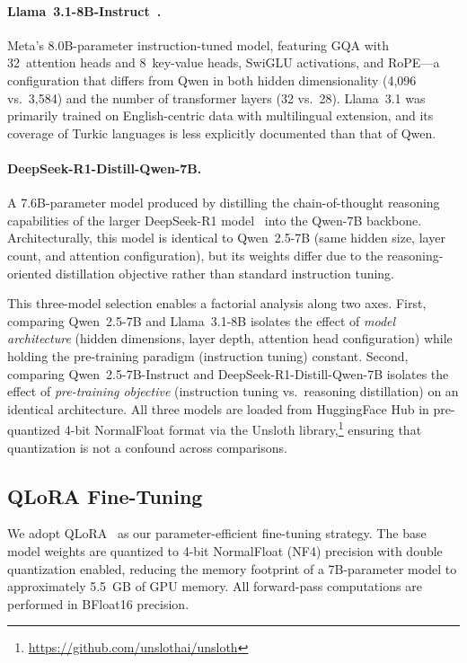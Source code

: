 \documentclass[runningheads]{llncs}
\begin{document}
\paragraph{Llama~3.1-8B-Instruct~\cite{Grattafiori2024-ka}.} Meta's 8.0B-parameter instruction-tuned model, featuring GQA with 32~attention heads and 8~key-value heads, SwiGLU activations, and RoPE---a configuration that differs from Qwen in both hidden dimensionality (4{,}096 vs.\ 3{,}584) and the number of transformer layers (32 vs.\ 28). Llama~3.1 was primarily trained on English-centric data with multilingual extension, and its coverage of Turkic languages is less explicitly documented than that of Qwen.

\paragraph{DeepSeek-R1-Distill-Qwen-7B.} A 7.6B-parameter model produced by distilling the chain-of-thought reasoning capabilities of the larger DeepSeek-R1 model~\cite{DeepSeekR1} into the Qwen-7B backbone. Architecturally, this model is identical to Qwen~2.5-7B (same hidden size, layer count, and attention configuration), but its weights differ due to the reasoning-oriented distillation objective rather than standard instruction tuning.

This three-model selection enables a factorial analysis along two axes. First, comparing Qwen~2.5-7B and Llama~3.1-8B isolates the effect of \emph{model architecture} (hidden dimensions, layer depth, attention head configuration) while holding the pre-training paradigm (instruction tuning) constant. Second, comparing Qwen~2.5-7B-Instruct and DeepSeek-R1-Distill-Qwen-7B isolates the effect of \emph{pre-training objective} (instruction tuning vs.\ reasoning distillation) on an identical architecture. All three models are loaded from HuggingFace Hub in pre-quantized 4-bit NormalFloat format via the Unsloth library,\footnote{\url{https://github.com/unslothai/unsloth}} ensuring that quantization is not a confound across comparisons.

\subsection{QLoRA Fine-Tuning}
\label{sec:meth_qlora}

We adopt QLoRA~\cite{10.5555/3666122.3666563} as our parameter-efficient fine-tuning strategy. The base model weights are quantized to 4-bit NormalFloat (NF4) precision with double quantization enabled, reducing the memory footprint of a 7B-parameter model to approximately 5.5~GB of GPU memory. All forward-pass computations are performed in BFloat16 precision.
\end{document}
